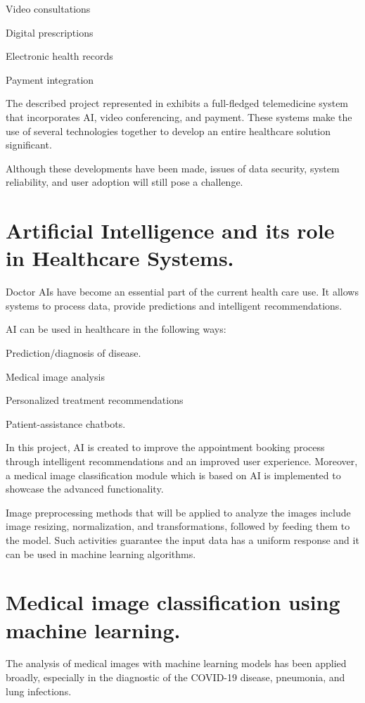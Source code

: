 Video consultations

Digital prescriptions

Electronic health records

Payment integration

The described project represented in exhibits a full-fledged telemedicine system that incorporates AI, video conferencing, and payment. These systems make the use of several technologies together to develop an entire healthcare solution significant.

Although these developments have been made, issues of data security, system reliability, and user adoption will still pose a challenge.

\section{Artificial Intelligence and its role in Healthcare Systems.}

Doctor AIs have become an essential part of the current health care use. It allows systems to process data, provide predictions and intelligent recommendations.

AI can be used in healthcare in the following ways:

Prediction/diagnosis of disease.

Medical image analysis

Personalized treatment recommendations

Patient-assistance chatbots.

In this project, AI is created to improve the appointment booking process through intelligent recommendations and an improved user experience. Moreover, a medical image classification module which is based on AI is implemented to showcase the advanced functionality.

Image preprocessing methods that will be applied to analyze the images include image resizing, normalization, and transformations, followed by feeding them to the model. Such activities guarantee the input data has a uniform response and it can be used in machine learning algorithms.

\section{Medical image classification using machine learning.}

The analysis of medical images with machine learning models has been applied broadly, especially in the diagnostic of the COVID-19 disease, pneumonia, and lung infections.

